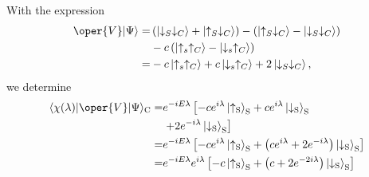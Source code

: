 With the expression
\begin{equation}
\begin{aligned}
\oper{V}|\Psi\rangle= & \left(\left|\downarrow_S \downarrow_C\right\rangle+\left|\uparrow_S \downarrow_C\right\rangle\right)-\left(\left|\uparrow_S \downarrow_C\right\rangle-\left|\downarrow_S \downarrow_C\right\rangle\right) \\
& -c\left(\left|\uparrow_s \uparrow_C\right\rangle-\left|\downarrow_s \uparrow_C\right\rangle\right) \\
= & -c\left|\uparrow_s \uparrow_C\right\rangle+c\left|\downarrow_s \uparrow_C\right\rangle+2\left|\downarrow_S \downarrow_C\right\rangle,
\end{aligned}
\end{equation}
we determine
\begin{equation}
\begin{aligned}
\langle\chi(\lambda)|\oper{V}| \Psi\rangle_{\mathrm{C}}= & e^{-i E \lambda}\left[-c e^{i \lambda}\left|\uparrow_{\mathrm{S}}\right\rangle_{\mathrm{S}}+c e^{i \lambda}\left|\downarrow_{\mathrm{S}}\right\rangle_{\mathrm{S}}\right. \\
& \left.+2 e^{-i \lambda}\left|\downarrow_{\mathrm{S}}\right\rangle_{\mathrm{S}}\right] \\
= & e^{-i E \lambda}\left[-c e^{i \lambda}\left|\uparrow_{\mathrm{S}}\right\rangle_{\mathrm{S}}+\left(c e^{i \lambda}+2 e^{-i \lambda}\right)\left|\downarrow_{\mathrm{S}}\right\rangle_{\mathrm{S}}\right] \\
= & e^{-i E \lambda} e^{i \lambda}\left[-c\left|\uparrow_{\mathrm{S}}\right\rangle_{\mathrm{S}}+\left(c+2 e^{-2 i \lambda}\right)\left|\downarrow_{\mathrm{S}}\right\rangle_{\mathrm{S}}\right]
\end{aligned}
\end{equation}

